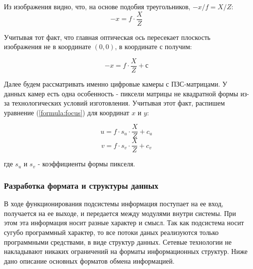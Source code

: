 Из изображения видно, что, на основе подобия треугольников, $-x/f = X/Z$:
$$	-x = f \cdot \frac{X}{Z} $$

Учитывая тот факт, что главная оптическая ось пересекает плоскость изображения не в координате $(0,0)$, в координате $с$ получим:

\begin{equation}
\label{formula:focus}
-x = f \cdot \frac{X}{Z} + с
\end{equation}

Далее будем рассматривать именно цифровые камеры с ПЗС-матрицами. У данных камер есть одна особенность - пиксели матрицы не квадратной формы из-за технологических условий изготовления. Учитывая этот факт, распишем уравнение (\ref{formula:focus}) для координат $x$ и $y$:

$$ u = f \cdot s_u \cdot \frac{X}{Z} + c_u $$
$$ v = f \cdot s_v \cdot \frac{X}{Z} + c_v $$

где $s_u$ и $s_v$ - коэффициенты формы пикселя.



\subsubsection{Разработка формата и структуры данных}
В ходе функционирования подсистемы информация поступает на ее вход, получается на ее выходе, и передается между модулями внутри системы. 
При этом эта информация носит разные характер и смысл. Так как подсистема носит сугубо программный характер, то все потоки даных реализуются только программными средствами, в виде структур данных. Сетевые технологии не накладывают никаких ограничений на форматы информационных структур. 
Ниже дано описание основных форматов обмена информацией.

